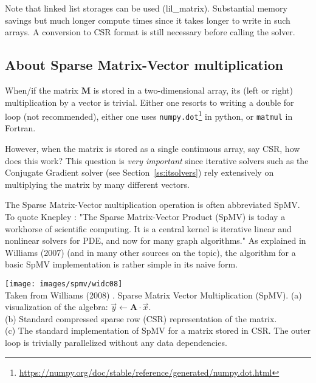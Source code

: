 Note that linked list storages can be used (lil\_matrix). Substantial memory savings 
but much longer compute times since it takes longer to write in such arrays.
A conversion to CSR format is still necessary before calling the solver.




\subsection{About Sparse Matrix-Vector multiplication} \label{ss:spmv}
 

When/if the matrix ${\bm M}$ is stored in a two-dimensional array, 
its (left or right) multiplication by a vector is trivial. 
Either one resorts to writing a double for loop (not recommended), 
either one uses {\tt numpy.dot}\footnote{\url{https://numpy.org/doc/stable/reference/generated/numpy.dot.html}}
in python, or {\tt matmul} in Fortran.

However, when the matrix is stored as a single continuous array, say CSR, how does this work?
This question is {\it very important} since iterative solvers such as the Conjugate Gradient solver
(see Section~\ref{ss:itsolvers}) rely extensively on multiplying the matrix by many different vectors. 

The Sparse Matrix-Vector multiplication operation is often abbreviated SpMV.
To quote Knepley \cite{knepley}: "The Sparse Matrix-Vector Product (SpMV) is today 
a workhorse of scientific computing. It is a central kernel is iterative linear and 
nonlinear solvers for PDE, and now for many graph algorithms."
As explained in Williams \etal (2007) \cite{wiov07} (and in many 
other sources on the topic), the algorithm for 
a basic SpMV implementation is rather simple in its naive form. 

\begin{center}
\texttt{[image: images/spmv/widc08]}\\
{\captionfont Taken from Williams \etal (2008) \cite{widc08}. 
Sparse Matrix Vector Multiplication (SpMV). 
(a) visualization of the algebra: $\vec{y} \leftarrow {\bm A}\cdot \vec{x}$.\\
(b) Standard compressed sparse row (CSR) representation of the matrix.  \\
(c) The standard implementation of SpMV for a matrix stored in CSR. 
The outer loop is trivially parallelized without any data dependencies.}
\end{center}

